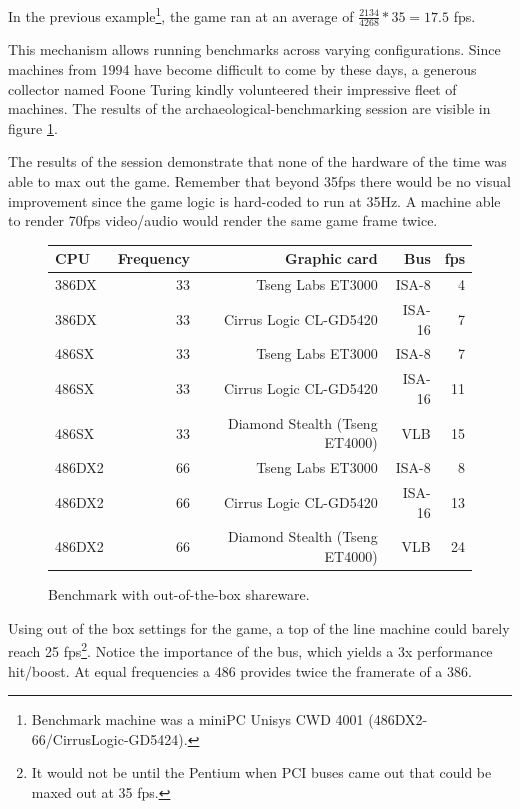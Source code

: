  
In the previous example\footnote{Benchmark machine was a miniPC Unisys CWD 4001 (486DX2-66/CirrusLogic-GD5424).}, the game ran at an average of $\frac{2134}{4268}*35 = 17.5$ fps. \\
\par
This mechanism allows running benchmarks across varying configurations. Since machines from 1994 have become difficult to come by these days, a generous collector named Foone Turing kindly volunteered their impressive fleet of machines. The results of the archaeological-benchmarking session are visible in figure \ref{bnechmarsks}.\\
\par
 The results of the session demonstrate that none of the hardware of the time was able to max out the game. Remember that beyond 35fps there would be no visual improvement since the game logic is hard-coded to run at 35Hz. A machine able to render 70fps video/audio would render the same game frame twice.\\
\par
\begin{figure}[H]
\centering  
\begin{tabularx}{\textwidth}{ L{1}  R{0.3} R{2.4} R{1} R{0.3} }
  \toprule
   \textbf{CPU} & \textbf{Frequency} & \textbf{Graphic card} & \textbf{Bus} & \textbf{fps}\\
  \toprule 
  386DX & 33 & Tseng Labs ET3000    & ISA-8  &  4\\
  386DX\protect{\footnotemark} & 33 & Cirrus Logic CL-GD5420 & ISA-16 &  7\\
  \toprule 
  486SX & 33 & Tseng Labs ET3000                & ISA-8  &  7\\
  486SX & 33 & Cirrus Logic CL-GD5420           & ISA-16 & 11\\ 
  486SX & 33 & Diamond Stealth (Tseng ET4000)   & VLB    & 15\\
  \toprule 
  486DX2 & 66 & Tseng Labs ET3000               & ISA-8  &  8\\
  486DX2 & 66 & Cirrus Logic CL-GD5420          & ISA-16 & 13\\
  486DX2 & 66 & Diamond Stealth (Tseng ET4000)  & VLB    & 24\\
   \toprule
 \end{tabularx}
\caption{Benchmark with out-of-the-box \doom{} shareware.}
\label{bnechmarsks}
\end{figure}\label{benchmarks}
\par
Using out of the box settings for the game, a top of the line machine could barely reach 25 fps\footnote{It would not be until the Pentium when PCI buses came out that \doom{} could be maxed out at 35 fps.}. Notice the importance of the bus, which yields a 3x performance hit/boost. At equal frequencies a 486 provides twice the framerate of a 386.\\
\par






